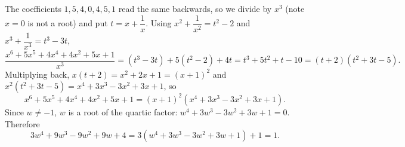 The coefficients $1,5,4,0,4,5,1$ read the same backwards, so we divide by $x^3$ (note $x=0$ is not a root) and put $t=x+\dfrac{1}{x}$. Using $x^2+\dfrac{1}{x^2}=t^2-2$ and $x^3+\dfrac{1}{x^3}=t^3-3t$,
\[
\dfrac{x^6+5x^5+4x^4+4x^2+5x+1}{x^3}=(t^3-3t)+5(t^2-2)+4t=t^3+5t^2+t-10=(t+2)(t^2+3t-5).
\]
Multiplying back, $x(t+2)=x^2+2x+1=(x+1)^2$ and $x^2(t^2+3t-5)=x^4+3x^3-3x^2+3x+1$, so
\[
x^6+5x^5+4x^4+4x^2+5x+1=(x+1)^2\left(x^4+3x^3-3x^2+3x+1\right).
\]
Since $w\ne-1$, $w$ is a root of the quartic factor: $w^4+3w^3-3w^2+3w+1=0$. Therefore
\[
3w^4+9w^3-9w^2+9w+4=3\left(w^4+3w^3-3w^2+3w+1\right)+1=\boxed{1}.
\]
